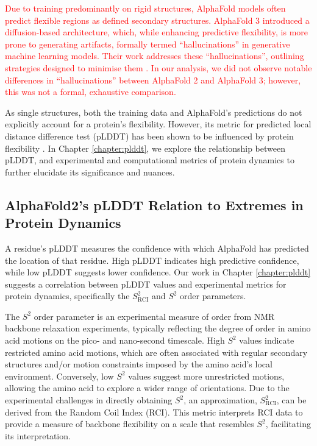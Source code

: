 \textcolor{red}{Due to training predominantly on rigid structures, AlphaFold models often predict flexible regions as defined secondary structures. AlphaFold 3 introduced a diffusion-based architecture, which, while enhancing predictive flexibility, is more prone to generating artifacts, formally termed ``hallucinations'' in generative machine learning models. Their work addresses these ``hallucinations'', outlining strategies designed to minimise them \cite{abramson_accurate_2024}. In our analysis, we did not observe notable differences in ``hallucinations'' between AlphaFold 2 and AlphaFold 3; however, this was not a formal, exhaustive comparison. }

As single structures, both the training data and AlphaFold's predictions do not explicitly account for a protein's flexibility. However, its metric for predicted local distance difference test (pLDDT) has been shown to be influenced by protein flexibility \cite{saldano_impact_2022}. In Chapter \ref{chapter:plddt}, we explore the relationship between pLDDT, and experimental and computational metrics of protein \gls{dynamics} to further elucidate its significance and nuances.


\subsection{AlphaFold2's pLDDT Relation to Extremes in Protein Dynamics}

A residue's pLDDT measures the confidence with which AlphaFold has predicted the location of that residue. High pLDDT indicates high predictive confidence, while low pLDDT suggests lower confidence. Our work in Chapter \ref{chapter:plddt} \cite{gavalda-garcia_gradations_2024} suggests a correlation between pLDDT values and experimental metrics for protein \gls{dynamics}, specifically the $S^{2}_{\text{RCI}}$ and $S^{2}$ order parameters.

The $S^{2}$ order parameter is an experimental measure of order from NMR backbone relaxation experiments, typically reflecting the degree of order in amino acid motions on the pico- and nano-second timescale. High $S^{2}$ values indicate restricted amino acid motions, which are often associated with regular secondary structures and/or motion constraints imposed by the amino acid's local environment. Conversely, low $S^{2}$ values suggest more unrestricted motions, allowing the amino acid to explore a wider range of orientations. Due to the experimental challenges in directly obtaining $S^{2}$, an approximation, $S^{2}_{\text{RCI}}$, can be derived from the Random Coil Index (RCI). This metric interprets RCI data to provide a measure of backbone flexibility on a scale that resembles $S^{2}$, facilitating its interpretation.

